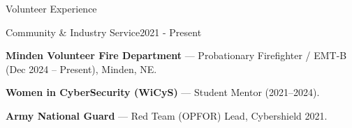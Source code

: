 \documentclass{resume} %
\begin{document}

\begin{rSection}{Volunteer Experience}

\begin{rSubsection}{Community \& Industry Service}{2021 - Present}{}{}
\item {\bf Minden Volunteer Fire Department} --- Probationary Firefighter / EMT-B (Dec 2024 -- Present), Minden, NE.
\item {\bf Women in CyberSecurity (WiCyS)} --- Student Mentor (2021--2024).
\item {\bf Army National Guard} --- Red Team (OPFOR) Lead, Cybershield 2021.
\end{rSubsection}

\end{rSection}






\end{document}
